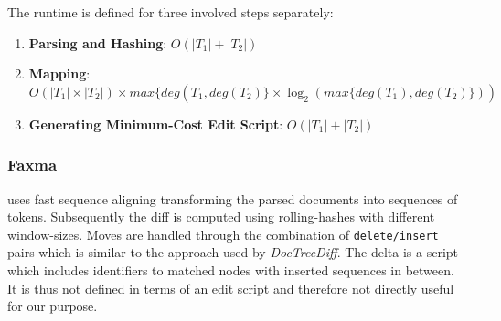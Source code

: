 

The runtime is defined for three involved steps separately: 

\begin{enumerate}
\item {\bf{Parsing and Hashing}}: $O(|T_{1}| + |T_{2}|)$
\item {\bf{Mapping}}: $O(|T_{1}| \times |T_{2}|) \times max\{deg(T_{1}, deg(T_{2})\} \times \log_{2}(max\{deg(T_{1}), deg(T_{2})\}))$
\item {\bf{Generating Minimum-Cost Edit Script}}: $O(|T_{1}| + |T_{2}|)$
\end{enumerate}

\subsubsection{Faxma\cite{lindholm2006fast}}
uses fast sequence aligning transforming the parsed documents into sequences of tokens. Subsequently the diff is computed using rolling-hashes with different window-sizes. Moves are handled through the combination of \texttt{delete/insert} pairs which is similar to the approach used by \emph{DocTreeDiff}. The delta is a script which includes identifiers to matched nodes with inserted sequences in between. It is thus not defined in terms of an edit script and therefore not directly useful for our purpose.   %



